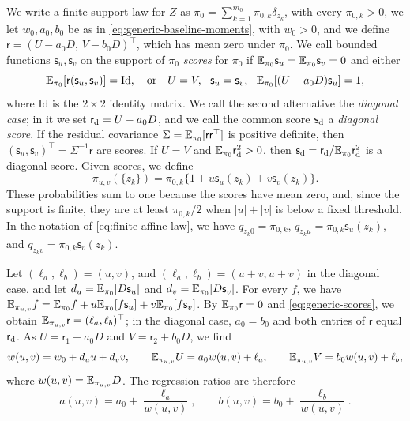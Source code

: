 We write a finite-support law for $Z$ as
$\pi_0=\sum_{k=1}^{m_0}\pi_{0,k}\delta_{z_k}$, with every
$\pi_{0,k}>0$, we let $w_0,a_0,b_0$ be as in
\eqref{eq:generic-baseline-moments}, with $w_0>0$, and we define
$\mathsf r=(U-a_0D,\,V-b_0D)^\top$, which has mean zero under $\pi_0$.
We call bounded functions $\mathsf s_u,\mathsf s_v$ on the support of
$\pi_0$ \emph{scores} for $\pi_0$ if
$\mathbb E_{\pi_0}\mathsf s_u=\mathbb E_{\pi_0}\mathsf s_v=0$ and either
\begin{equation}\label{eq:generic-scores}
 \mathbb E_{\pi_0}[\mathsf r(\mathsf s_u,\mathsf s_v)]=\mathrm{Id},
 \quad\text{or}\quad
 U=V,\ \ \mathsf s_u=\mathsf s_v,\ \ \mathbb E_{\pi_0}[(U-a_0D)\mathsf s_u]=1,
\end{equation}
where $\mathrm{Id}$ is the $2\times2$ identity matrix. We call the
second alternative the \emph{diagonal case}; in it we set
$\mathsf r_{\rm d}=U-a_0D$, and we call the common score
$\mathsf s_{\rm d}$ a \emph{diagonal score}. If the residual covariance
$\Sigma=\mathbb E_{\pi_0}[\mathsf r\mathsf r^\top]$ is positive definite, then
$(\mathsf s_u,\mathsf s_v)^\top=\Sigma^{-1}\mathsf r$ are scores. If
$U=V$ and $\mathbb E_{\pi_0}\mathsf r_{\rm d}^2>0$, then
$\mathsf s_{\rm d}=\mathsf r_{\rm d}/\mathbb E_{\pi_0}\mathsf r_{\rm d}^2$ is a
diagonal score. Given scores, we define
\begin{equation}\label{eq:generic-affine-response}
 \pi_{u,v}(\{z_k\})
 =\pi_{0,k}\{1+u\mathsf s_u(z_k)+v\mathsf s_v(z_k)\}.
\end{equation}
These probabilities sum to one because the scores have mean zero, and,
since the support is finite, they are at least $\pi_{0,k}/2$ when
$|u|+|v|$ is below a fixed threshold. In the notation of
\eqref{eq:finite-affine-law}, we have $q_{z_k0}=\pi_{0,k}$,
$q_{z_ku}=\pi_{0,k}\mathsf s_u(z_k)$, and
$q_{z_kv}=\pi_{0,k}\mathsf s_v(z_k)$.

Let $(\ell_a,\ell_b)=(u,v)$, and $(\ell_a,\ell_b)=(u+v,u+v)$ in the
diagonal case, and let $d_u=\mathbb E_{\pi_0}[D\mathsf s_u]$ and
$d_v=\mathbb E_{\pi_0}[D\mathsf s_v]$. For every $f$, we have
$\mathbb E_{\pi_{u,v}}f=\mathbb E_{\pi_0}f+u\mathbb E_{\pi_0}[f\mathsf s_u]+v\mathbb E_{\pi_0}[f\mathsf s_v]$.
By $\mathbb E_{\pi_0}\mathsf r=0$ and \eqref{eq:generic-scores}, we obtain
$\mathbb E_{\pi_{u,v}}\mathsf r=(\ell_a,\ell_b)^\top$; in the diagonal case,
$a_0=b_0$ and both entries of $\mathsf r$ equal $\mathsf r_{\rm d}$.
As $U=\mathsf r_1+a_0D$ and $V=\mathsf r_2+b_0D$, we find
\begin{equation}\label{eq:generic-affine-moments}
 w(u,v)=w_0+d_uu+d_vv,\qquad
 \mathbb E_{\pi_{u,v}}U=a_0w(u,v)+\ell_a,\qquad
 \mathbb E_{\pi_{u,v}}V=b_0w(u,v)+\ell_b,
\end{equation}
where $w(u,v)=\mathbb E_{\pi_{u,v}}D$. The regression ratios are therefore
\begin{equation}\label{eq:generic-lower-regressions}
 a(u,v)=a_0+\frac{\ell_a}{w(u,v)},\qquad
 b(u,v)=b_0+\frac{\ell_b}{w(u,v)}.
\end{equation}

